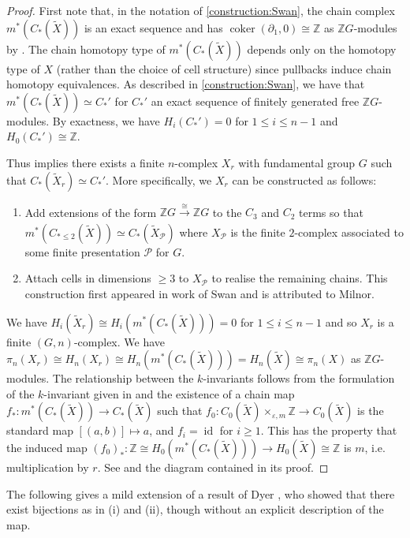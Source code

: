\documentclass[11pt,leqno,a4paper]{amsart}
\newcommand{\Z}{\mathbb{Z}}
\DeclareMathOperator{\id}{id}
\DeclareMathOperator{\coker}{coker}
\theoremstyle{definition}
\theoremstyle{remark}
\theoremstyle{custom}
\newenvironment{clist}[1]
{\begin{enumerate}[\normalfont #1]}
{\end{enumerate}}
\newcommand{\wt}{\widetilde}
\begin{document}
\begin{proof}
First note that, in the notation of \cref{construction:Swan}, the chain complex $m^*(C_*(\wt X))$ is an exact sequence and has $\coker(\partial_1,0) \cong \Z$ as $\Z G$-modules by \cite[Lemma 4.12]{Ni20a}. The chain homotopy type of $m^*(C_*(\wt X))$ depends only on the homotopy type of $X$ (rather than the choice of cell structure) since pullbacks induce chain homotopy equivalences.
As described in \cref{construction:Swan}, we have that $m^*(C_*(\wt X)) \simeq C_*'$ for $C_*'$ an exact sequence of finitely generated free $\Z G$-modules. By exactness, we have $H_i(C_*') = 0$ for $1 \le i \le n-1$ and $H_0(C_*') \cong \Z$.

Thus \cite[Corollary 8.27]{Jo12a} implies there exists a finite $n$-complex $X_r$ with fundamental group $G$ such that $C_*(\wt X_r) \simeq C_*'$. More specifically, we $X_r$ can be constructed as follows:
\begin{clist}{(a)}
\item 
Add extensions of the form $\Z G \xrightarrow[]{\cong} \Z G$ to the $C_3$ and $C_2$ terms so that $m^*(C_{* \le 2}(\wt X)) \simeq C_*(\wt X_{\mathcal{P}})$ where $X_{\mathcal{P}}$ is the finite $2$-complex associated to some finite presentation $\mathcal{P}$ for $G$.
\item
Attach cells in dimensions $\ge 3$ to $X_{\mathcal{P}}$ to realise the remaining chains. This construction first appeared in work of Swan \cite[Lemma 3.1]{Sw60-II} and is attributed to Milnor.
\end{clist}

We have $H_i(\wt X_r) \cong H_i(m^*(C_*(\wt X)))=0$ for $1 \le i \le n-1$ and so $X_r$ is a finite $(G,n)$-complex. We have $\pi_n(X_r) \cong H_n(X_r) \cong H_n(m^*(C_*(\wt X))) = H_n(\wt X) \cong \pi_n(X)$ as $\Z G$-modules.
The relationship between the $k$-invariants follows from the formulation of the $k$-invariant given in \cite[Section 34]{Jo03a} and the existence of a chain map $f_* : m^*(C_*(\wt X)) \to C_*(\wt X)$ such that $f_0 : C_0(\wt X) \times_{\varepsilon,m} \Z \to C_0(\wt X)$ is the standard map $[(a,b)] \mapsto a$, and $f_i = \id$ for $i \ge 1$. This has the property that the induced map $(f_0)_* : \Z \cong H_0(m^*(C_*(\wt X))) \to H_0(\wt X) \cong \Z$ is $m$, i.e. multiplication by $r$. See \cite[Lemma 4.11]{Ni20a} and the diagram contained in its proof.
\end{proof}

The following gives a mild extension of a result of Dyer \cite[Theorem 9.1]{Dy76}, who showed that there exist bijections as in (i) and (ii), though without an explicit description of the map.
\end{document}
